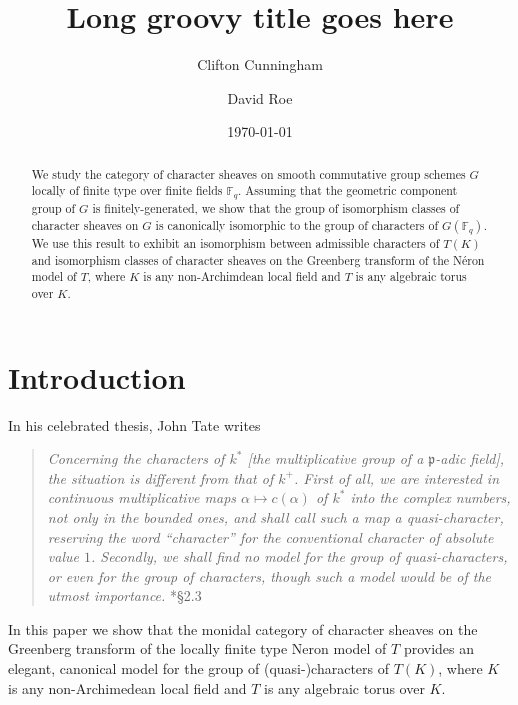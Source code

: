 \documentclass[11pt]{amsart}
\title[Short groovy title goes here]{Long groovy title goes here}
\date{\today}
\author{Clifton Cunningham}
\author{David Roe}
\theoremstyle{plain}
\theoremstyle{definition}
\theoremstyle{remark}
\begin{document}
\begin{abstract}
We study the category of character sheaves on smooth commutative group schemes $G$ locally of finite type over finite fields $\mathbb{F}_q$. Assuming that the geometric component group of $G$ is finitely-generated, we show that the group of isomorphism classes of character sheaves on $G$ is canonically isomorphic to the group of characters of $G(\mathbb{F}_q)$. We use this result to exhibit an isomorphism between admissible characters of $T(K)$ and isomorphism classes of character sheaves on the Greenberg transform of the Néron model of $T$, where $K$ is any non-Archimdean local field and $T$ is any algebraic torus over $K$.
\end{abstract}

\maketitle

\section{Introduction}

%
In his celebrated thesis, John Tate writes 
\begin{quotation}
{\it Concerning the characters of $k^*$ [the multiplicative group of a $\mathfrak{p}$-adic field], the situation is different from that of $k^+$.
First of all, we are interested in continuous multiplicative maps $\alpha \mapsto c(\alpha)$ of $k^*$ into the complex numbers, not only in the bounded ones, and shall call such a map a quasi-character, reserving the word ``character'' for the conventional character of absolute value $1$. Secondly, 
we shall find no model for the group of quasi-characters, or even for the group of characters, though such a model would be of the utmost importance.}  \cite{Tate:thesis}*{\S 2.3}
\end{quotation}
\noindent
In this paper we show that the monidal category of character sheaves on the Greenberg transform of the locally finite type Neron model of $T$ provides an elegant, canonical model for the group of (quasi-)characters of $T(K)$, where $K$ is any non-Archimedean local field and $T$ is any algebraic torus over $K$.
\end{document}
